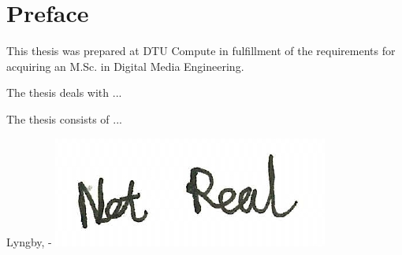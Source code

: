\chapter{Preface}

This thesis was prepared at DTU Compute in fulfillment of the requirements for acquiring an M.Sc. in Digital Media Engineering.

The thesis deals with ...

The thesis consists of ...
\vspace{20mm}
\begin{center}
    \hspace{20mm} Lyngby, \thesishandin-\thesisyear
    \vspace{5mm}
    \newline
    \includegraphics[scale=0.5]{figures/SignatureDummy}
\end{center}
\begin{flushright}
    \thesisauthor
\end{flushright}

